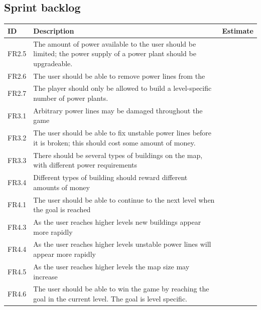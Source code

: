 \clearpage
\subsection{Sprint backlog}

	\begin{tabular}{| p{1.2cm} | p{8cm} | p{3cm} |}
		\hline
		\rowcolor{gray}
		ID & Description & Estimate \\ \hline

		FR2.5 & The amount of power available to the user should be limited; 
		the power supply of a power plant should be upgradeable. & \\ \hline

		FR2.6 & The user should be able to remove power lines from the 
		& \\ \hline

		FR2.7 & The player should only be allowed to build a level-specific 
		number of power plants. & \\ \hline

		FR3.1 & Arbitrary power lines may be damaged throughout the game & \\ \hline

		FR3.2 & The user should be able to fix unstable power lines before it is 
		broken; this should cost some amount of money. & \\ \hline

		FR3.3 & There should be several types of buildings on the map, with different 
		power requirements & \\ \hline

		FR3.4 & Different types of building should reward different amounts of 
		money & \\ \hline

		FR4.1 & The user should be able to continue to the next level when the goal is 
		reached & \\ \hline

		FR4.3 & As the user reaches higher levels new buildings appear more 
		rapidly & \\ \hline

		FR4.4 & As the user reaches higher levels unstable power lines will appear 
		more rapidly & \\ \hline

		FR4.5 & As the user reaches higher levels the map size may increase & \\ \hline

		FR4.6 & The user should be able to win the game by reaching the goal in 
		the current level. The goal is level specific. & \\ \hline


\end{tabular}
